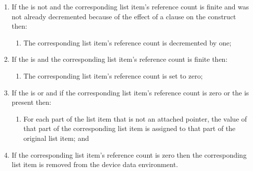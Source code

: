 \begin{enumerate}
\item If the  is not  and the corresponding list 
      item's reference count is finite and was not already decremented because 
      of the effect of a  clause on the construct then:

\begin{enumerate}
\item The corresponding list item's reference count is decremented by one;
\end{enumerate}

\item If the  is  and the corresponding list item's 
      reference count is finite then:

\begin{enumerate}
\item The corresponding list item's reference count is set to zero;
\end{enumerate}

\item If the  is  or  and if the 
      corresponding list item's reference count is zero or the  
       is present then:

\begin{enumerate}


\item For each part of the list item that is not an attached pointer, the value
      of that part of the corresponding list item is assigned to that part of 
      the original list item; and
\end{enumerate}

\item If the corresponding list item's reference count is zero then the 
      corresponding list item is removed from the device data environment.
\end{enumerate}

